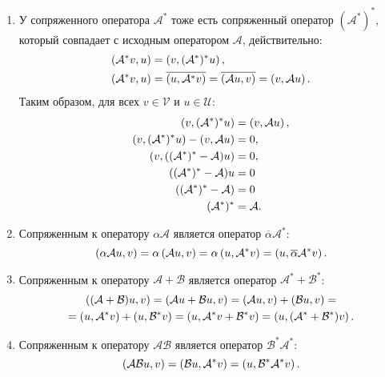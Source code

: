 \begin{enumerate}
    \item У сопряженного оператора $\mathcal{A}^*$ тоже есть сопряженный оператор $(\mathcal{A}^*)^*$, который совпадает с исходным оператором $\mathcal{A}$,
    действительно:
    \begin{align*}
        \left ( \mathcal{A}^* v, u \right )
        & = \left ( v, (\mathcal{A}^*)^* u \right ) , \\
        \left ( \mathcal{A}^* v, u \right )
        & = \overline{\left ( u, \mathcal{A}^* v \right )}
        = \overline{\left ( \mathcal{A} u, v \right )}
        = \left ( v, \mathcal{A} u \right ).
    \end{align*}
    Таким образом, для всех $v \in \mathcal{V}$ и $u \in \mathcal{U}$:
    \begin{align*}
        \left ( v, (\mathcal{A}^*)^* u \right ) & = \left ( v, \mathcal{A} u \right ), \\
        \left ( v, (\mathcal{A}^*)^* u \right ) - \left ( v, \mathcal{A} u \right ) & = 0, \\
        \left ( v, ((\mathcal{A}^*)^* - \mathcal{A} ) u \right ) & = 0, \\
        ((\mathcal{A}^*)^* - \mathcal{A} ) u & = 0 \\
        ((\mathcal{A}^*)^* - \mathcal{A} ) & = 0 \\
        (\mathcal{A}^*)^* & = \mathcal{A} .
    \end{align*}

    \item Сопряженным к оператору $\alpha \mathcal{A}$ является оператор $\overline{\alpha} \mathcal{A}^*$:
    \[
        \left ( \alpha \mathcal{A} u, v \right )
        = \alpha \left ( \mathcal{A} u, v \right )
        = \alpha \left ( u, \mathcal{A}^* v \right )
        = \left ( u, \overline{\alpha} \mathcal{A}^* v \right ) .
    \]

    \item Сопряженным к оператору $\mathcal{A} + \mathcal{B}$ является оператор $\mathcal{A}^* + \mathcal{B}^*$:
    \begin{multline*}
        \left ( (\mathcal{A} + \mathcal{B}) u, v \right )
        = \left ( \mathcal{A} u + \mathcal{B} u, v \right )
        = \left ( \mathcal{A} u, v \right ) + \left ( \mathcal{B} u, v \right ) = \\
        = \left ( u, \mathcal{A}^* v \right ) + \left ( u, \mathcal{B}^* v \right )
        = \left ( u, \mathcal{A}^* v + \mathcal{B}^* v \right )
        = \left ( u, (\mathcal{A}^* + \mathcal{B}^*) v \right ) .
    \end{multline*}

    \item Сопряженным к оператору $\mathcal{A} \mathcal{B}$ является оператор $\mathcal{B}^* \mathcal{A}^*$:
    \[
        \left ( \mathcal{A} \mathcal{B} u, v \right )
        = \left ( \mathcal{B} u, \mathcal{A}^* v \right )
        = \left ( u, \mathcal{B}^* \mathcal{A}^* v \right ) .
    \]
\end{enumerate}


